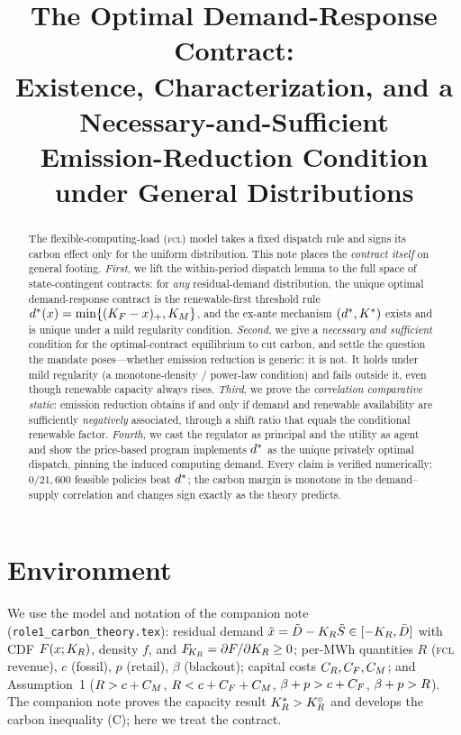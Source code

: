 \title[The Optimal Demand-Response Contract]
{The Optimal Demand-Response Contract:\\
Existence, Characterization, and a Necessary-and-Sufficient\\
Emission-Reduction Condition under General Distributions}



\begin{abstract}
The flexible-computing-load (\textsc{fcl}) model takes a fixed dispatch rule and
signs its carbon effect only for the uniform distribution. This note places the
\emph{contract itself} on general footing. \emph{First}, we lift the within-period
dispatch lemma to the full space of state-contingent contracts: for \emph{any}
residual-demand distribution, the unique optimal demand-response contract is the
renewable-first threshold rule $d^{*}(x)=\min\{(K_F-x)_+,K_M\}$, and the ex-ante
mechanism $(d^{*},K^{*})$ exists and is unique under a mild regularity condition.
\emph{Second}, we give a \emph{necessary and sufficient} condition for the
optimal-contract equilibrium to cut carbon, and settle the question the mandate
poses---whether emission reduction is generic: it is not. It holds under mild
regularity (a monotone-density / power-law condition) and fails outside it, even
though renewable capacity always rises. \emph{Third}, we prove the
\emph{correlation comparative static}: emission reduction obtains if and only if
demand and renewable availability are sufficiently \emph{negatively} associated,
through a shift ratio that equals the conditional renewable factor. \emph{Fourth},
we cast the regulator as principal and the utility as agent and show the
price-based program implements $d^{*}$ as the unique privately optimal dispatch,
pinning the induced computing demand. Every claim is verified numerically:
$0/21{,}600$ feasible policies beat $d^{*}$; the carbon margin is monotone in the
demand--supply correlation and changes sign exactly as the theory predicts.
\end{abstract}



\section{Environment}\label{r1exc-sec:env}

We use the model and notation of the companion note
(\texttt{role1\_carbon\_theory.tex}): residual demand
$\tilde x=\tilde D-K_R\tilde S\in[-K_R,\bar D]$ with CDF $F(x;K_R)$, density
$f$, and $F_{\!K_R}=\partial F/\partial K_R\ge0$; per-MWh quantities $R$ (\textsc{fcl}
revenue), $c$ (fossil), $p$ (retail), $\beta$ (blackout); capital costs
$C_R,C_F,C_M$; and Assumption~1 ($R>c+C_M$, $R<c+C_F+C_M$, $\beta+p>c+C_F$,
$\beta+p>R$). The companion note proves the capacity result $K_R^{*}>K_R^{\circ}$ and develops
the carbon inequality (C); here we treat the contract.

